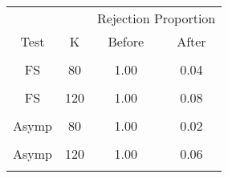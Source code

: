 \begin{table}[!h]
\centering
\begin{tabular}{cccc}
\toprule
\multicolumn{1}{c}{ } & \multicolumn{1}{c}{ } & \multicolumn{2}{c}{Rejection Proportion} \\
\cmidrule(l{3pt}r{3pt}){3-4}
Test & K & Before & After\\
\midrule
\cellcolor{gray!6}{FS} & \cellcolor{gray!6}{60} & \cellcolor{gray!6}{1.00} & \cellcolor{gray!6}{0.02}\\
FS & 80 & 1.00 & 0.04\\
\cellcolor{gray!6}{FS} & \cellcolor{gray!6}{100} & \cellcolor{gray!6}{1.00} & \cellcolor{gray!6}{0.05}\\
FS & 120 & 1.00 & 0.08\\
\cellcolor{gray!6}{Asymp} & \cellcolor{gray!6}{60} & \cellcolor{gray!6}{1.00} & \cellcolor{gray!6}{0.03}\\
\addlinespace
Asymp & 80 & 1.00 & 0.02\\
\cellcolor{gray!6}{Asymp} & \cellcolor{gray!6}{100} & \cellcolor{gray!6}{1.00} & \cellcolor{gray!6}{0.06}\\
Asymp & 120 & 1.00 & 0.06\\
\cellcolor{gray!6}{ECE} & \cellcolor{gray!6}{} & \cellcolor{gray!6}{0.23} & \cellcolor{gray!6}{0.14}\\
\bottomrule
\end{tabular}
\end{table}
